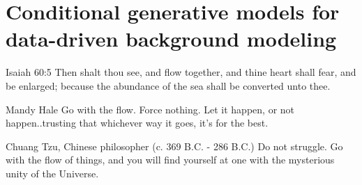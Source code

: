\chapter{Conditional generative models for data-driven background modeling}

\begin{chapquote}{Isaiah 60:5}
{Then shalt thou see, and flow together, and thine heart shall fear, and be enlarged; because the abundance of the sea shall be converted unto thee.}
\end{chapquote}

\begin{chapquote}{Mandy Hale}
{Go with the flow. Force nothing. Let it happen, or not happen..trusting that whichever way it goes, it's for the best.}
\end{chapquote}

\begin{chapquote}{Chuang Tzu, Chinese philosopher (c. 369 B.C. - 286 B.C.)}
{Do not struggle. Go with the flow of things, and you will find yourself at one with the mysterious unity of the Universe.}
\end{chapquote}
